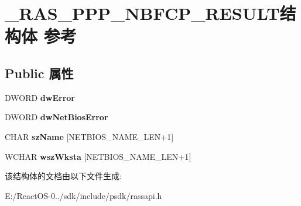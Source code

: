 \hypertarget{struct___r_a_s___p_p_p___n_b_f_c_p___r_e_s_u_l_t}{}\section{\+\_\+\+R\+A\+S\+\_\+\+P\+P\+P\+\_\+\+N\+B\+F\+C\+P\+\_\+\+R\+E\+S\+U\+L\+T结构体 参考}
\label{struct___r_a_s___p_p_p___n_b_f_c_p___r_e_s_u_l_t}
\subsection*{Public 属性}
\begin{DoxyCompactItemize}
\item 
\mbox{\label{struct___r_a_s___p_p_p___n_b_f_c_p___r_e_s_u_l_t_a073bc24dcae1429d9195a33b806e4644}} 
D\+W\+O\+RD {\bfseries dw\+Error}
\item 
\mbox{\label{struct___r_a_s___p_p_p___n_b_f_c_p___r_e_s_u_l_t_ae33aad2e8b304ea776e9f8ef3ef42d94}} 
D\+W\+O\+RD {\bfseries dw\+Net\+Bios\+Error}
\item 
\mbox{\label{struct___r_a_s___p_p_p___n_b_f_c_p___r_e_s_u_l_t_a408e0fcc1b9ab08f23f2e10cdcd57d45}} 
C\+H\+AR {\bfseries sz\+Name} \mbox{[}N\+E\+T\+B\+I\+O\+S\+\_\+\+N\+A\+M\+E\+\_\+\+L\+EN+1\mbox{]}
\item 
\mbox{\label{struct___r_a_s___p_p_p___n_b_f_c_p___r_e_s_u_l_t_ac60b7437af4b1b2e70d345150c1a2858}} 
W\+C\+H\+AR {\bfseries wsz\+Wksta} \mbox{[}N\+E\+T\+B\+I\+O\+S\+\_\+\+N\+A\+M\+E\+\_\+\+L\+EN+1\mbox{]}
\end{DoxyCompactItemize}


该结构体的文档由以下文件生成\+:\begin{DoxyCompactItemize}
\item 
E\+:/\+React\+O\+S-\/0../sdk/include/psdk/rassapi.\+h\end{DoxyCompactItemize}
